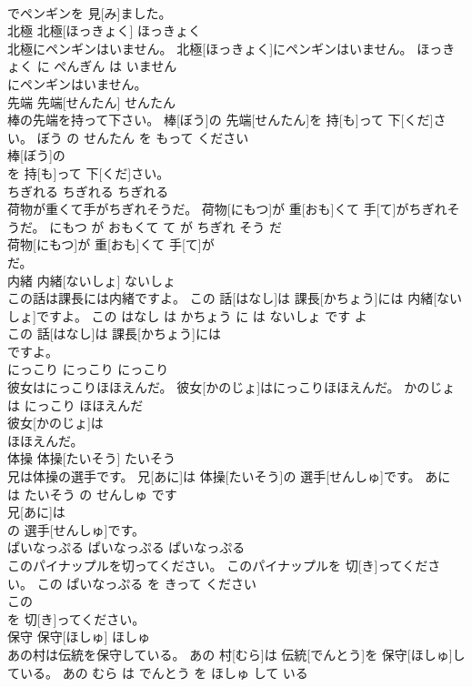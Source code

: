 \documentclass[8pt]{extreport}
\begin{document}
\begin{CJK}{UTF8}{min}
\\	でペンギンを 見[み]ました。			
\\	北極	北極[ほっきょく]	ほっきょく	
\\	北極にペンギンはいません。	北極[ほっきょく]にペンギンはいません。	ほっきょく に ぺんぎん は いません	
\\	にペンギンはいません。			
\\	先端	先端[せんたん]	せんたん	
\\	棒の先端を持って下さい。	棒[ぼう]の 先端[せんたん]を 持[も]って 下[くだ]さい。	ぼう の せんたん を もって ください	
\\	棒[ぼう]の
\\	を 持[も]って 下[くだ]さい。			
\\	ちぎれる	ちぎれる	ちぎれる	
\\	荷物が重くて手がちぎれそうだ。	荷物[にもつ]が 重[おも]くて 手[て]がちぎれそうだ。	にもつ が おもくて て が ちぎれ そう だ	
\\	荷物[にもつ]が 重[おも]くて 手[て]が
\\	だ。			
\\	内緒	内緒[ないしょ]	ないしょ	
\\	この話は課長には内緒ですよ。	この 話[はなし]は 課長[かちょう]には 内緒[ないしょ]ですよ。	この はなし は かちょう に は ないしょ です よ	
\\	この 話[はなし]は 課長[かちょう]には
\\	ですよ。			
\\	にっこり	にっこり	にっこり	
\\	彼女はにっこりほほえんだ。	彼女[かのじょ]はにっこりほほえんだ。	かのじょ は にっこり ほほえんだ	
\\	彼女[かのじょ]は
\\	ほほえんだ。			
\\	体操	体操[たいそう]	たいそう	
\\	兄は体操の選手です。	兄[あに]は 体操[たいそう]の 選手[せんしゅ]です。	あに は たいそう の せんしゅ です	
\\	兄[あに]は
\\	の 選手[せんしゅ]です。			
\\	ぱいなっぷる	ぱいなっぷる	ぱいなっぷる	
\\	このパイナップルを切ってください。	このパイナップルを 切[き]ってください。	この ぱいなっぷる を きって ください	
\\	この
\\	を 切[き]ってください。			
\\	保守	保守[ほしゅ]	ほしゅ	
\\	あの村は伝統を保守している。	あの 村[むら]は 伝統[でんとう]を 保守[ほしゅ]している。	あの むら は でんとう を ほしゅ して いる	

\end{CJK}
\end{document}
